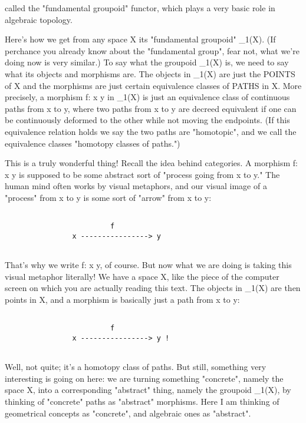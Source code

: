 called the "fundamental groupoid" functor, which plays a very basic role
in algebraic topology.  

Here's how we get from any space X its "fundamental groupoid"
\Pi _{1}(X).  (If perchance you already know about the
"fundamental group", fear not, what we're doing now is very
similar.)  To say what the groupoid \Pi _{1}(X) is, we need to say
what its objects and morphisms are.  The objects in \Pi _{1}(X)
are just the POINTS of X and the morphisms are just certain equivalence
classes of PATHS in X.  More precisely, a morphism f: x \to  y in
\Pi _{1}(X) is just an equivalence class of continuous paths from
x to y, where two paths from x to y are decreed equivalent if one can be
continuously deformed to the other while not moving the endpoints.  (If
this equivalence relation holds we say the two paths are
"homotopic", and we call the equivalence classes
"homotopy classes of paths.")

This is a truly wonderful thing!  Recall the idea behind categories.
A morphism f: x \to  y is supposed to be some abstract sort of "process
going from x to y."  The human mind often works by visual metaphors, and
our visual image of a "process" from x to y is some sort of "arrow" from
x to y:


\begin{verbatim}

                         f
                x ----------------> y


\end{verbatim}
    
That's why we write f: x \to  y, of course.  But now what we are doing is
taking this visual metaphor literally!  We have a space X, like the
piece of the computer screen on which you are actually reading this
text.  The objects in \Pi _{1}(X) are then points in X, and a morphism is
basically just a path from x to y:


\begin{verbatim}

                         f
                x ----------------> y !


\end{verbatim}
    
Well, not quite; it's a homotopy class of paths.  But still, something
very interesting is going on here: we are turning something
"concrete", namely the space X, into a corresponding
"abstract" thing, namely the groupoid \Pi _{1}(X), by
thinking of "concrete" paths as "abstract"
morphisms.  Here I am thinking of geometrical concepts as
"concrete", and algebraic ones as "abstract".

